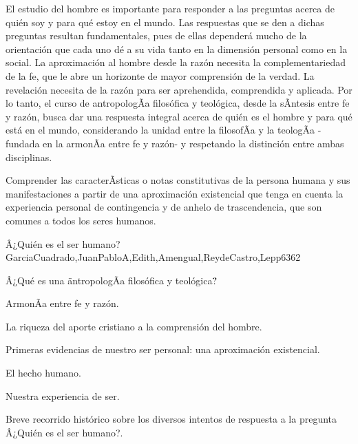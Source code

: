 \begin{syllabus}


\begin{justification}
El estudio del hombre es importante para responder a las preguntas acerca de quién soy y para qué estoy en el mundo. Las respuestas que se den a dichas preguntas resultan fundamentales, pues de ellas dependerá mucho de la orientación que cada uno dé a su vida tanto en la dimensión personal como en la social. La aproximación al hombre desde la razón necesita la complementariedad de la fe, que le abre un horizonte de mayor comprensión de la verdad. La revelación necesita de la razón para ser aprehendida, comprendida y aplicada. Por lo tanto, el curso de antropologÃ­a filosófica y teológica, desde la sÃ­ntesis entre fe y razón, busca dar una respuesta integral acerca de quién es el hombre y para qué está en el mundo, considerando la unidad entre la filosofÃ­a y la teologÃ­a -fundada en la armonÃ­a entre fe y razón- y respetando la distinción entre ambas disciplinas.
\end{justification}

\begin{goals}
\item Comprender las caracterÃ­sticas o notas constitutivas de la persona humana y sus manifestaciones a partir de una aproximación existencial que tenga en cuenta la experiencia personal de contingencia y de anhelo de trascendencia, que son comunes a todos los seres humanos.
\end{goals}

\begin{outcomes}
\end{outcomes}

\begin{unit}{Â¿Quién es el ser humano?}{GarciaCuadrado,JuanPabloA,Edith,Amengual,ReydeCastro,Lepp63}{6}{2}
\begin{topics}
 		\item Â¿Qué es una \"antropologÃ­a filosófica y teológica\"?
 		\item ArmonÃ­a entre fe y razón.
 		\item La riqueza del aporte cristiano a la comprensión del hombre.
 		\item Primeras evidencias de nuestro ser personal: una aproximación existencial.
 		\item El hecho humano.
 		\item Nuestra experiencia de ser.
 		\item Breve recorrido histórico sobre los diversos intentos de respuesta a la pregunta Â¿Quién es el ser humano?. 
\end{topics}


\end{unit}
\end{syllabus}
